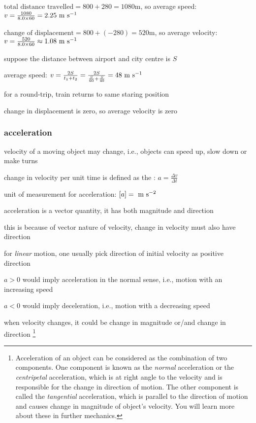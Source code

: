 \sol $\text{total distance travelled} = 800 + 280 = 1080 \text{m}$, so average speed: $v = \frac{1080}{8.0\times60} = 2.25 \text{ m s$^{-1}$}$

\eqyskip  $\text{change of displacement} = 800 + (-280) = 520 \text{m}$, so average velocity: $v = \frac{520}{8.0\times60} \approx 1.08 \text{ m s$^{-1}$}$ \eoe


\sol suppose the distance between airport and city centre is $S$

average speed: $v = \frac{2S}{t_1 + t_2} = \frac{2S}{\frac{S}{60} + \frac{S}{40}} = 48 \text{ m s$^{-1}$}$

for a round-trip, train returns to same staring position

change in displacement is zero, so average velocity is zero \eoe



\subsubsection{acceleration}

velocity of a moving object may change, i.e., objects can speed up, slow down or make turns

\begin{ilight}
	\centering change in velocity per unit time is defined as the : $\boxed{a = \frac{\Delta v}{\Delta t}}$
\end{ilight}

\cmt unit of measurement for acceleration: $[a]= \text{ m s$^{-2}$}$

\cmt acceleration is a vector quantity, it has both magnitude and direction

this is because of vector nature of velocity, change in velocity must also have direction

\cmt for \emph{linear} motion, one usually pick direction of initial velocity as positive direction

$a>0$ would imply acceleration in the normal sense, i.e., motion with an increasing speed

$a<0$ would imply deceleration, i.e., motion with a decreasing speed

\cmt when velocity changes, it could be change in magnitude or/and change in direction
\footnote{Acceleration of an object can be considered as the combination of two components. One component is known as the \emph{normal} acceleration or the \emph{centripetal} acceleration, which is at right angle to the velocity and is responsible for the change in direction of motion. The other component is called the \emph{tangential} acceleration, which is parallel to the direction of motion and causes change in magnitude of object's velocity. You will learn more about these in further mechanics.}

